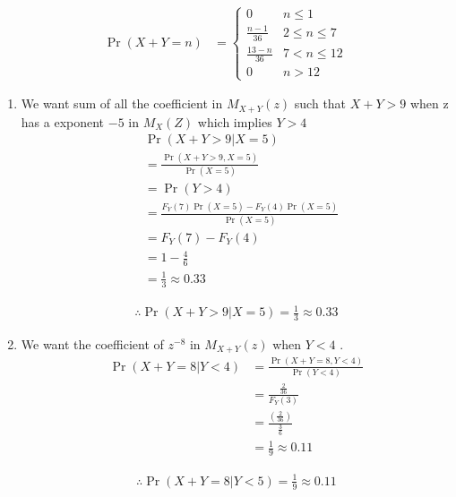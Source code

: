 \documentclass[journal,12pt,twocolumn]{IEEEtran}
\providecommand{\pr}[1]{\ensuremath{\Pr\left(#1\right)}}
\providecommand{\brak}[1]{\ensuremath{\left(#1\right)}}
\theoremstyle{remark}
\begin{document}
\begin{align}
\pr{X+Y= n} &= 
\begin{cases}
0 & n \le 1
\\
\frac{n-1}{36} &  2 \le n \le  7
\\
\frac{13-n}{36} & 7 < n \le 12
\\
0 & n > 12
\end{cases}
\label{prsum}
\end{align}
\begin{enumerate}[label=(\alph*)]
    \item
    We want sum of all the coefficient in  $M_{X+Y}(z)$ such that $X+Y >9$ when z has a exponent $-5$ in $M_{X}(Z)$ which implies $Y>4$
    \begin{align}
        &\pr{X+Y> 9 | X = 5} \\&= \frac{\pr{X+Y> 9, X = 5}}{\pr{X = 5}}\\
                          &= \pr{Y > 4}\\
                          &= \frac{F_{Y}(7)\pr{X = 5} - F_{Y}(4)\pr{X = 5}}{\pr{X = 5}}\\
                          &= F_{Y}(7) -F_{Y}(4)\\
                          &= 1 - \frac{4}{6}\\
                          &= \frac{1}{3} \approx 0.33
    \end{align}

    \begin{align}
        \therefore \pr{X+Y> 9 | X = 5} = \frac{1}{3}\approx 0.33
    \end{align}
    
\item
We want the coefficient of $z^{-8}$ in $M_{X+Y}(z)$ when $Y < 4$ .
\begin{align}
\pr{X+Y = 8 | Y < 4} &= \frac{\pr{X+Y = 8, Y < 4}}{\pr{Y < 4}}\\
                       &= \frac{\frac{2}{36}}{ F_{Y}(3)}\\
                       &= \frac{\brak{\frac{2}{36}}}{\frac{3}{6}}\\
                       &= \frac{1}{9} \approx 0.11   
\end{align}

\begin{align}
        \therefore \pr{X+Y = 8 | Y <  5} = \frac{1}{9}\approx 0.11
    \end{align}
\end{enumerate}
\end{document}
